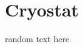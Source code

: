 \documentclass[m_cmp_sc_manual.tex]{subfiles}
\begin{document}
\section{Cryostat}
random text here
\end{document}
